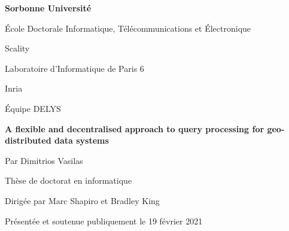 \documentclass[a4paper,usenames,dvipsnames]{report}
\begin{document}
\begin{center}

{\Huge{\bf Sorbonne Universit\'e}}

\vspace*{1cm}

{\Large\'Ecole Doctorale Informatique, T\'el\'ecommunications et \'Electronique}

\vspace*{0.3cm}

{\Large Scality}

\vspace*{0.3cm}

{\Large Laboratoire d’Informatique de Paris 6}

\vspace*{0.3cm}

{\Large Inria}

\vspace*{0.3cm}

{\Large \'Equipe DELYS}

\vspace*{1cm}

{\LARGE {\bf A flexible and decentralised approach to query processing for geo-distributed data systems}}

\vspace*{1.5cm}

{\Large Par Dimitrios Vasilas}

\vspace*{1cm}

{\Large Th\`ese de doctorat en informatique}

\vspace*{1cm}

{\Large Dirig\'ee par Marc Shapiro et Bradley King}

\vspace*{1cm}

{\large Pr\'esent\'ee et soutenue publiquement le 19 f\'evrier 2021}

\end{center}
\end{document}
